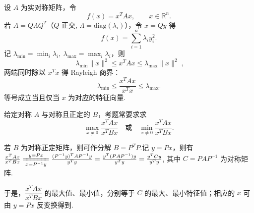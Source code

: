 设 $A$ 为实对称矩阵，令
\[
    f(x)=x^T A x,\qquad x\in\mathbb R^n.
\]
若 $A=Q\Lambda Q^T$（$Q$ 正交, $\Lambda=\mathrm{diag}(\lambda_i)$），令 $x=Qy$ 得
\[
    f(x)=\sum_{i=1}^n\lambda_i y_i^2.
\]
记 $\lambda_{\min}=\min_i\lambda_i,\ \lambda_{\max}=\max_i\lambda_i$，则
\[
    \boxed{\;\lambda_{\min}\|x\|^2 \le x^TAx \le \lambda_{\max}\|x\|^2\;},
\]
两端同时除以 $x^Tx$ 得 Rayleigh 商界：
\[
    \lambda_{\min}\le \frac{x^TAx}{x^Tx}\le \lambda_{\max}.
\]
等号成立当且仅当 $x$ 为对应的特征向量.

给定对称 $A$ 与对称且正定的 $B$，考题常要求求
\[
    \max_{x\ne0}\frac{x^TAx}{x^TBx}\quad\text{或}\quad\min_{x\ne0}\frac{x^TAx}{x^TBx}.
\]

若 $B$ 为对称正定矩阵，则可作分解 $B=P^TP$.记 $y=Px$，则有
$\frac{x^TAx}{x^TBx}\xlongequal[x=P^{-1}y]{y=Px} \frac{(P^{-1}y)^TAP^{-1}y}{y^Ty}=\frac{y^T(PAP^{-1})y}{y^Ty}=\frac{y^TCy}{y^Ty}$,
其中 $C=PAP^{-1}$ 为对称矩阵.

于是，$\dfrac{x^TAx}{x^TBx}$ 的最大值、最小值，分别等于 $C$ 的最大、最小特征值；相应的 $x$ 可由 $y=Px$ 反变换得到.